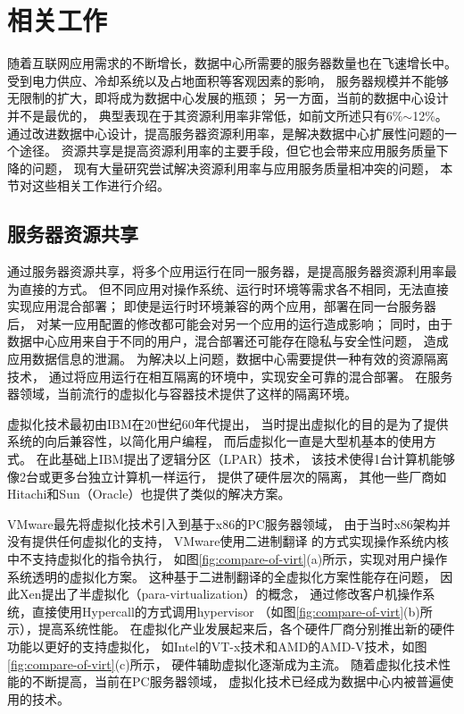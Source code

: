 

\chapter{相关工作}
\label{chap:background}

随着互联网应用需求的不断增长，数据中心所需要的服务器数量也在飞速增长中。
受到电力供应、冷却系统以及占地面积等客观因素的影响，
服务器规模并不能够无限制的扩大，即将成为数据中心发展的瓶颈；
另一方面，当前的数据中心设计并不是最优的，
典型表现在于其资源利用率非常低，如前文所述只有6\%$\sim$12\%。
通过改进数据中心设计，提高服务器资源利用率，是解决数据中心扩展性问题的一个途径。
资源共享是提高资源利用率的主要手段，但它也会带来应用服务质量下降的问题，
现有大量研究尝试解决资源利用率与应用服务质量相冲突的问题，
本节对这些相关工作进行介绍。

\section{服务器资源共享}

通过服务器资源共享，将多个应用运行在同一服务器，是提高服务器资源利用率最为直接的方式。
但不同应用对操作系统、运行时环境等需求各不相同，无法直接实现应用混合部署；
即使是运行时环境兼容的两个应用，部署在同一台服务器后，
对某一应用配置的修改都可能会对另一个应用的运行造成影响；
同时，由于数据中心应用来自于不同的用户，混合部署还可能存在隐私与安全性问题，
造成应用数据信息的泄漏。
为解决以上问题，数据中心需要提供一种有效的资源隔离技术，
通过将应用运行在相互隔离的环境中，实现安全可靠的混合部署。
在服务器领域，当前流行的虚拟化与容器技术提供了这样的隔离环境。

虚拟化技术最初由IBM在20世纪60年代提出，
当时提出虚拟化的目的是为了提供系统的向后兼容性，以简化用户编程，
而后虚拟化一直是大型机基本的使用方式。
在此基础上IBM提出了逻辑分区（LPAR）\cite{IBM_LPAR:2007}技术，
该技术使得1台计算机能够像2台或更多台独立计算机一样运行，
提供了硬件层次的隔离，
其他一些厂商如Hitachi\cite{hitachi-lpar}和Sun（Oracle）\cite{LDom}也提供了类似的解决方案。

VMware最先将虚拟化技术引入到基于x86的PC服务器领域，
由于当时x86架构并没有提供任何虚拟化的支持，
VMware使用二进制翻译\cite{vmware-compare-hw-sw:2006}
的方式实现操作系统内核中不支持虚拟化的指令执行，
如图\ref{fig:compare-of-virt}(a)所示，实现对用户操作系统透明的虚拟化方案。
这种基于二进制翻译的全虚拟化方案性能存在问题，
因此Xen提出了半虚拟化（para-virtualization）\cite{barham_xen_2003}的概念，
通过修改客户机操作系统，直接使用Hypercall的方式调用hypervisor
（如图\ref{fig:compare-of-virt}(b)所示），提高系统性能。
在虚拟化产业发展起来后，各个硬件厂商分别推出新的硬件功能以更好的支持虚拟化，
如Intel的VT-x技术和AMD的AMD-V技术，如图\ref{fig:compare-of-virt}(c)所示，
硬件辅助虚拟化逐渐成为主流。
随着虚拟化技术性能的不断提高，当前在PC服务器领域，
虚拟化技术已经成为数据中心内被普遍使用的技术。

